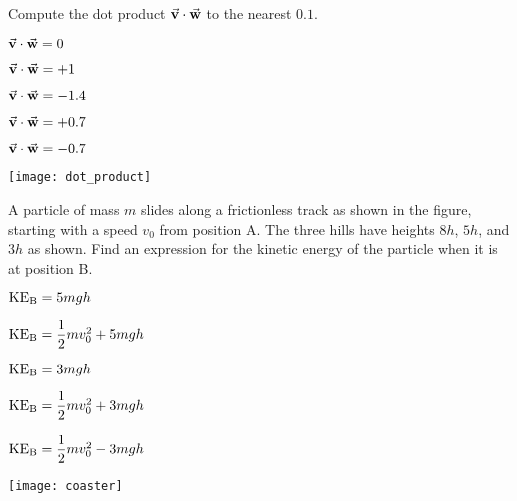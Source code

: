 \documentclass[11pt]{article}
\begin{document}
\begin{enumerate}
\begin{minipage}[t]{.5\lw}
\item Compute the dot product $\vec{\bf v}\cdot\vec{\bf w}$ to the nearest $0.1$.
\begin{choices}
\item $\vec{\bf v}\cdot\vec{\bf w}=0$
\item $\vec{\bf v}\cdot\vec{\bf w}=+1$
\item $\vec{\bf v}\cdot\vec{\bf w}=-1.4$
\item $\vec{\bf v}\cdot\vec{\bf w}=+0.7$
\item $\vec{\bf v}\cdot\vec{\bf w}=-0.7$
\end{choices}
\end{minipage}\hfill
\begin{minipage}[t]{.45\lw}
\vspace{0in}
\flushright
\texttt{[image: dot\_product]}
\end{minipage}

\newpage

\item A particle of mass $m$ slides along a frictionless track as shown in the figure, starting with a speed $v_0$ from position A. The three hills have heights $8h$, $5h$, and $3h$ as shown. Find an expression for the kinetic energy of the particle when it is at position B.\\
\begin{minipage}[t]{.4\lw}
\begin{choices}
\item ${\rm KE}_{\rm B}=5mgh$
\item ${\rm KE}_{\rm B}=\dfrac{1}{2}mv_0^2+5mgh$
\item ${\rm KE}_{\rm B}=3mgh$
\item ${\rm KE}_{\rm B}=\dfrac{1}{2}mv_0^2+3mgh$
\item ${\rm KE}_{\rm B}=\dfrac{1}{2}mv_0^2-3mgh$
\end{choices}
\end{minipage}\hfill
\begin{minipage}[t]{.55\lw}
\vspace{0in}
\flushright
\texttt{[image: coaster]}
\end{minipage}

\vfill


\end{enumerate}
\end{document}
